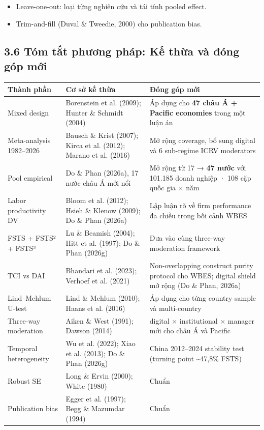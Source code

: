 \documentclass[12pt,a4paper]{article}
\providecommand{\tightlist}{\setlength{\itemsep}{0pt}\setlength{\parskip}{0pt}}
\begin{document}
\begin{itemize}
\tightlist
\item
  Leave-one-out: loại từng nghiên cứu và tái tính pooled effect.
\item
  Trim-and-fill (Duval \& Tweedie, 2000) cho publication bias.
\end{itemize}

\hypertarget{36-tuxf3m-tux1eaft-phux1b0ux1a1ng-phuxe1p-kux1ebf-thux1eeba-vuxe0-ux111uxf3ng-guxf3p-mux1edbi}{%
\subsection{3.6 Tóm tắt phương pháp: Kế thừa và đóng góp
mới}\label{36-tuxf3m-tux1eaft-phux1b0ux1a1ng-phuxe1p-kux1ebf-thux1eeba-vuxe0-ux111uxf3ng-guxf3p-mux1edbi}}

\begin{longtable}[]{@{}lll@{}}
\toprule\noalign{}
Thành phần & Cơ sở kế thừa & Đóng góp mới \\
\midrule\noalign{}
\endhead
\bottomrule\noalign{}
\endlastfoot
Mixed design & Borenstein et al. (2009); Hunter \& Schmidt (2004) & Áp
dụng cho \textbf{47 châu Á + Pacific economies} trong một luận án \\
Meta-analysis 1982--2026 & Bausch \& Krist (2007); Kirca et al. (2012);
Marano et al. (2016) & Mở rộng coverage, bổ sung digital và 6 sub-regime
ICRV moderators \\
Pool empirical & Do \& Phan (2026a), 17 nước châu Á mới nổi & Mở rộng từ
17 → \textbf{47 nước} với 101.185 doanh nghiệp · 108 cặp quốc gia ×
năm \\
Labor productivity DV & Bloom et al. (2012); Hsieh \& Klenow (2009); Do
\& Phan (2026a) & Lập luận rõ về firm performance đa chiều trong bối
cảnh WBES \\
FSTS + FSTS² + FSTS³ & Lu \& Beamish (2004); Hitt et al. (1997); Do \&
Phan (2026g) & Đưa vào cùng three-way moderation framework \\
TCI vs DAI & Bhandari et al. (2023); Verhoef et al. (2021) &
Non-overlapping construct purity protocol cho WBES; digital shield mở
rộng (Do \& Phan, 2026a) \\
Lind--Mehlum U-test & Lind \& Mehlum (2010); Haans et al. (2016) & Áp
dụng cho từng country sample và multi-country \\
Three-way moderation & Aiken \& West (1991); Dawson (2014) & digital ×
institutional × manager mới cho châu Á và Pacific \\
Temporal heterogeneity & Wu et al. (2022); Xiao et al. (2013); Do \&
Phan (2026g) & China 2012--2024 stability test (turning point
\textasciitilde47,8\% FSTS) \\
Robust SE & Long \& Ervin (2000); White (1980) & Chuẩn \\
Publication bias & Egger et al. (1997); Begg \& Mazumdar (1994) &
Chuẩn \\
\end{longtable}
\end{document}
